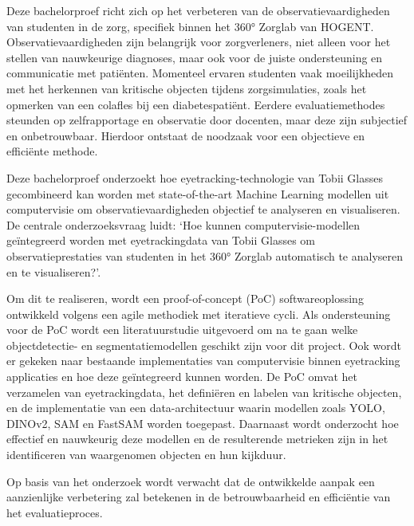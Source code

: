 Deze bachelorproef richt zich op het verbeteren van de observatievaardigheden van studenten in de zorg, specifiek binnen het 360° Zorglab van HOGENT. 
Observatievaardigheden zijn belangrijk voor zorgverleners, niet alleen voor het stellen van nauwkeurige diagnoses, maar ook voor de juiste ondersteuning en communicatie met patiënten. 
Momenteel ervaren studenten vaak moeilijkheden met het herkennen van kritische objecten tijdens zorgsimulaties, zoals het opmerken van een colafles bij een diabetespatiënt.
Eerdere evaluatiemethodes steunden op zelfrapportage en observatie door docenten, maar deze zijn subjectief en onbetrouwbaar. Hierdoor ontstaat de noodzaak voor een objectieve en efficiënte methode.
\par
Deze bachelorproef onderzoekt hoe eyetracking-technologie van Tobii Glasses gecombineerd kan worden met state-of-the-art Machine Learning modellen uit computervisie om observatievaardigheden objectief te analyseren en visualiseren. 
De centrale onderzoeksvraag luidt: `Hoe kunnen computervisie-modellen geïntegreerd worden met eyetrackingdata van Tobii Glasses om observatieprestaties van studenten in het 360° Zorglab automatisch te analyseren en te visualiseren?'.
\par
Om dit te realiseren, wordt een proof-of-concept (PoC) softwareoplossing ontwikkeld volgens een agile methodiek met iteratieve cycli.
Als ondersteuning voor de PoC wordt een literatuurstudie uitgevoerd om na te gaan welke objectdetectie- en segmentatiemodellen geschikt zijn voor dit project.
Ook wordt er gekeken naar bestaande implementaties van computervisie binnen eyetracking applicaties en hoe deze geïntegreerd kunnen worden.
De PoC omvat het verzamelen van eyetrackingdata, het definiëren en labelen van kritische objecten, en de implementatie van een data-architectuur waarin modellen zoals YOLO, DINOv2, SAM en FastSAM worden toegepast. 
Daarnaast wordt onderzocht hoe effectief en nauwkeurig deze modellen en de resulterende metrieken zijn in het identificeren van waargenomen objecten en hun kijkduur.
\par
Op basis van het onderzoek wordt verwacht dat de ontwikkelde aanpak een aanzienlijke verbetering zal betekenen in de betrouwbaarheid en efficiëntie van het evaluatieproces.
